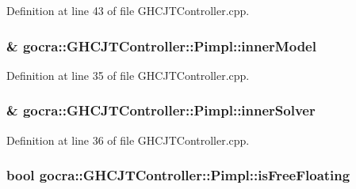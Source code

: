 Definition at line 43 of file G\+H\+C\+J\+T\+Controller.\+cpp.

\subsubsection[{\texorpdfstring{inner\+Model}{innerModel}}]{\& gocra\+::\+G\+H\+C\+J\+T\+Controller\+::\+Pimpl\+::inner\+Model}\hypertarget{structgocra_1_1GHCJTController_1_1Pimpl_a43eb79ddf7ef332d76d850711fc57e8e}{}\label{structgocra_1_1GHCJTController_1_1Pimpl_a43eb79ddf7ef332d76d850711fc57e8e}


Definition at line 35 of file G\+H\+C\+J\+T\+Controller.\+cpp.

\subsubsection[{\texorpdfstring{inner\+Solver}{innerSolver}}]{\& gocra\+::\+G\+H\+C\+J\+T\+Controller\+::\+Pimpl\+::inner\+Solver}\hypertarget{structgocra_1_1GHCJTController_1_1Pimpl_af06224d9d2a704cb042b5b01d3bf18ab}{}\label{structgocra_1_1GHCJTController_1_1Pimpl_af06224d9d2a704cb042b5b01d3bf18ab}


Definition at line 36 of file G\+H\+C\+J\+T\+Controller.\+cpp.

\subsubsection[{\texorpdfstring{is\+Free\+Floating}{isFreeFloating}}]{\setlength{\rightskip}{0pt plus 5cm}bool gocra\+::\+G\+H\+C\+J\+T\+Controller\+::\+Pimpl\+::is\+Free\+Floating}\hypertarget{structgocra_1_1GHCJTController_1_1Pimpl_a04bbff0e011a7c0b2bff47c08ed32993}{}\label{structgocra_1_1GHCJTController_1_1Pimpl_a04bbff0e011a7c0b2bff47c08ed32993}


